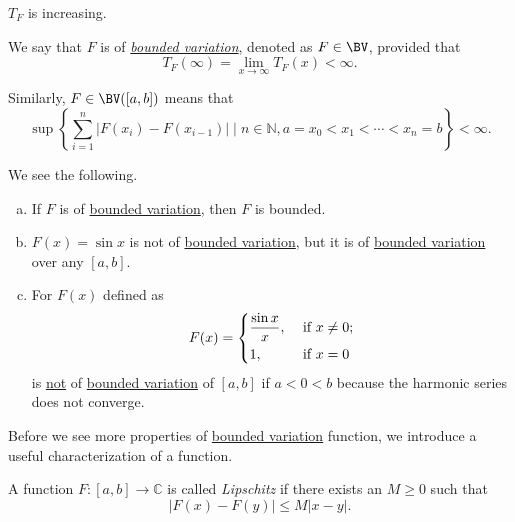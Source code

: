 \begin{remark}
	\(T_F\) is increasing.
\end{remark}

\begin{definition}\label{def:bounded-variation}
	We say that \(F\) is of \emph{\hyperref[def:bounded-variation]{bounded variation}}, denoted as \(F \in\BV\), provided that
	\[
		T_F(\infty) = \lim_{x \to \infty} T_F(x) < \infty.
	\]

	Similarly, \(F \in\BV([a,b])\) means that
	\[
		\sup \left\{\sum_{i=1}^n \left\vert F(x_i) - F(x_{i-1}) \right\vert \mid n \in \mathbb{N} , a = x_0 < x_1 < \cdots < x_n = b\right\} < \infty.
	\]
\end{definition}

\begin{remark}
	We see the following.
	\begin{enumerate}[(a)]
		\item If \(F\) is of \hyperref[def:bounded-variation]{bounded variation}, then \(F\) is bounded.
		\item \(F(x) = \sin x\) is not of \hyperref[def:bounded-variation]{bounded variation}, but it is of \hyperref[def:bounded-variation]{bounded variation}
		      over any \([a,b]\).
		\item For \(F(x)\) defined as
		      \[
			      F(x) = \begin{dcases}
				      \frac{\sin x}{x}, & \text{ if } x\neq 0 ; \\
				      1,                & \text{ if } x = 0
			      \end{dcases}
		      \]
		      is \underline{not} of \hyperref[def:bounded-variation]{bounded variation} of \([a,b]\) if \(a < 0 < b\) because the harmonic series does not converge.
	\end{enumerate}
\end{remark}

Before we see more properties of \hyperref[def:bounded-variation]{bounded variation} function, we introduce a useful characterization of a function.
\begin{definition}[Lipschitz]\label{def:Lipschitz}
	A function \(F \colon [a,b] \to \mathbb{C} \) is called \emph{Lipschitz} if there exists an
	\(M \geq 0\) such that
	\[
		\left\vert F(x) - F(y) \right\vert \leq M \left\vert x - y \right\vert.
	\]
\end{definition}

